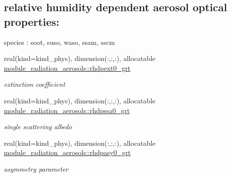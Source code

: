 \subsection*{relative humidity dependent aerosol optical properties\+:}
\label{_amgrp44cffce2235139b90d4d294d7b587144}%
species \+: soot, suso, waso, ssam, sscm \begin{DoxyCompactItemize}
\item 
\mbox{\label{group__module__radiation__aerosols_ga35a5c7b67a3cf11c5016a693e115d384}} 
real(kind=kind\+\_\+phys), dimension(\+:,\+:,\+:), allocatable \hyperlink{group__module__radiation__aerosols_ga35a5c7b67a3cf11c5016a693e115d384}{module\+\_\+radiation\+\_\+aerosols\+::rhdpext0\+\_\+grt}
\begin{DoxyCompactList}\small\item\em extinction coefficient \end{DoxyCompactList}\item 
\mbox{\label{group__module__radiation__aerosols_ga40d680662eadf30221997dadcce734b1}} 
real(kind=kind\+\_\+phys), dimension(\+:,\+:,\+:), allocatable \hyperlink{group__module__radiation__aerosols_ga40d680662eadf30221997dadcce734b1}{module\+\_\+radiation\+\_\+aerosols\+::rhdpssa0\+\_\+grt}
\begin{DoxyCompactList}\small\item\em single scattering albedo \end{DoxyCompactList}\item 
\mbox{\label{group__module__radiation__aerosols_gab5a0bbefbfed6b393f0abad26e6e4d04}} 
real(kind=kind\+\_\+phys), dimension(\+:,\+:,\+:), allocatable \hyperlink{group__module__radiation__aerosols_gab5a0bbefbfed6b393f0abad26e6e4d04}{module\+\_\+radiation\+\_\+aerosols\+::rhdpasy0\+\_\+grt}
\begin{DoxyCompactList}\small\item\em asymmetry parameter \end{DoxyCompactList}\end{DoxyCompactItemize}
